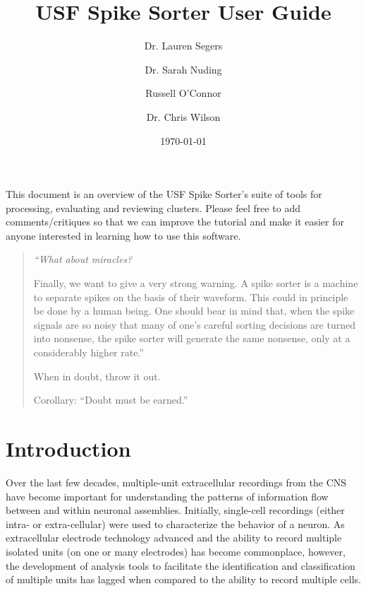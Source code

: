 \documentclass[12pt]{article}
\begin{document}
\title{\vspace{-.5in}
USF Spike Sorter User Guide}
\author{Dr. Lauren Segers\and Dr. Sarah Nuding\and Russell O'Connor\and Dr. Chris Wilson}
\date{\today}
\maketitle

This document is an overview of the USF Spike Sorter's suite of tools
for processing, evaluating and reviewing clusters.  Please feel free
to add comments/critiques so that we can improve the tutorial and make
it easier for anyone interested in learning how to use this software.

\vspace{.5in}

\begin{quote}
{\itshape ``What about miracles?}

Finally, we want to give a very strong warning. A spike sorter is a
machine to separate spikes on the basis of their waveform. This could
in principle be done by a human being. One should bear in mind that,
when the spike signals are so noisy that many of one's careful sorting
decisions are turned into nonsense, the spike sorter will generate the
same nonsense, only at a considerably higher rate.''

\begin{quote}
\end{quote}

When in doubt, throw it out.

\begin{quote}
\end{quote}

Corollary: ``Doubt must be earned.''

\end{quote}
\tableofcontents

\clearpage
\section{Introduction}

Over the last few decades, multiple-unit extracellular recordings from
the CNS have become important for understanding the patterns of
information flow between and within neuronal assemblies. Initially,
single-cell recordings (either intra- or extra-cellular) were used to
characterize the behavior of a neuron. As extracellular electrode
technology advanced and the ability to record multiple isolated units
(on one or many electrodes) has become commonplace, however, the
development of analysis tools to facilitate the identification and
classification of multiple units has lagged when compared to the
ability to record multiple cells.
\end{document}
